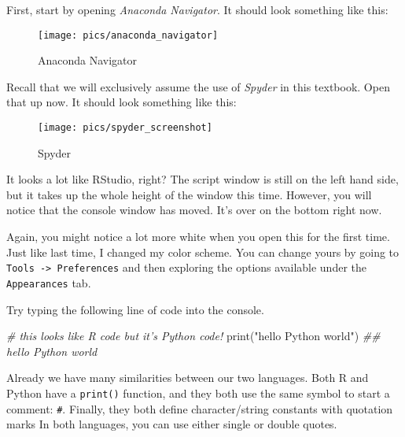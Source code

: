 \documentclass[12pt,krantz2]{krantz}
\makeatletter
\newenvironment{Shaded}{\begin{snugshade}}{\end{snugshade}}
\newcommand{\BuiltInTok}[1]{#1}
\newcommand{\CommentTok}[1]{\textcolor[rgb]{0.37,0.37,0.37}{\textit{#1}}}
\newcommand{\NormalTok}[1]{#1}
\newcommand{\StringTok}[1]{\textcolor[rgb]{0.5,0.5,0.5}{#1}}
\newenvironment{kframe}{%
\medskip{}
\setlength{\fboxsep}{.8em}
 \def\at@end@of@kframe{}%
 \ifinner\ifhmode%
  \def\at@end@of@kframe{\end{minipage}}%
  \begin{minipage}{\columnwidth}%
 \fi\fi%
 \def\FrameCommand##1{\hskip\@totalleftmargin \hskip-\fboxsep
 \colorbox{shadecolor}{##1}\hskip-\fboxsep
     \hskip-\linewidth \hskip-\@totalleftmargin \hskip\columnwidth}%
 \MakeFramed {\advance\hsize-\width
   \@totalleftmargin\z@ \linewidth\hsize
   \@setminipage}}%
 {\par\unskip\endMakeFramed%
 \at@end@of@kframe}
\renewenvironment{Shaded}{\begin{kframe}}{\end{kframe}}
\makeatother
\begin{document}
First, start by opening \emph{Anaconda Navigator}. It should look something like this:

\begin{figure}

{\centering \texttt{[image: pics/anaconda\_navigator]} 

}

\caption{Anaconda Navigator}\label{fig:anaconda-navigator}
\end{figure}

Recall that we will exclusively assume the use of \emph{Spyder} in this textbook. Open that up now. It should look something like this:

\begin{figure}

{\centering \texttt{[image: pics/spyder\_screenshot]} 

}

\caption{Spyder}\label{fig:spyder}
\end{figure}

It looks a lot like RStudio, right? The script window  is still on the left hand side, but it takes up the whole height of the window this time. However, you will notice that the console window has moved. It's over on the bottom right now.

Again, you might notice a lot more white when you open this for the first time. Just like last time, I changed my color scheme. You can change yours by going to \texttt{Tools\ -\textgreater{}\ Preferences} and then exploring the options available under the \texttt{Appearances} tab.

Try typing the following line of code into the console.

\begin{Shaded}
\begin{Highlighting}[]
\CommentTok{# this looks like R code but it's Python code!}
\BuiltInTok{print}\NormalTok{(}\StringTok{"hello Python world"}\NormalTok{)}
\CommentTok{## hello Python world}
\end{Highlighting}
\end{Shaded}

Already we have many similarities between our two languages. Both R and Python have a \texttt{print()} function, and they both use the same symbol to start a comment: \texttt{\#}. Finally, they both define character/string constants with quotation marks In both languages, you can use either single or double quotes.
\end{document}

